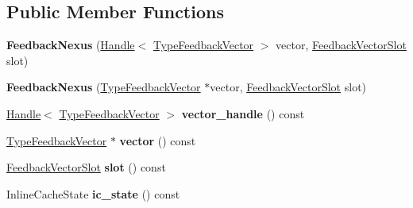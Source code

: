\subsection*{Public Member Functions}
\begin{DoxyCompactItemize}
\item 
{\bfseries Feedback\+Nexus} (\hyperlink{classv8_1_1internal_1_1_handle}{Handle}$<$ \hyperlink{classv8_1_1internal_1_1_type_feedback_vector}{Type\+Feedback\+Vector} $>$ vector, \hyperlink{classv8_1_1internal_1_1_feedback_vector_slot}{Feedback\+Vector\+Slot} slot)\hypertarget{classv8_1_1internal_1_1_feedback_nexus_a235196596e85d98454d7932fb36f234d}{}\label{classv8_1_1internal_1_1_feedback_nexus_a235196596e85d98454d7932fb36f234d}

\item 
{\bfseries Feedback\+Nexus} (\hyperlink{classv8_1_1internal_1_1_type_feedback_vector}{Type\+Feedback\+Vector} $\ast$vector, \hyperlink{classv8_1_1internal_1_1_feedback_vector_slot}{Feedback\+Vector\+Slot} slot)\hypertarget{classv8_1_1internal_1_1_feedback_nexus_a9ddae960046174fc5fb3e13eec04e27d}{}\label{classv8_1_1internal_1_1_feedback_nexus_a9ddae960046174fc5fb3e13eec04e27d}

\item 
\hyperlink{classv8_1_1internal_1_1_handle}{Handle}$<$ \hyperlink{classv8_1_1internal_1_1_type_feedback_vector}{Type\+Feedback\+Vector} $>$ {\bfseries vector\+\_\+handle} () const \hypertarget{classv8_1_1internal_1_1_feedback_nexus_a020af8fdd21b6cea3065d0f332d5bfc1}{}\label{classv8_1_1internal_1_1_feedback_nexus_a020af8fdd21b6cea3065d0f332d5bfc1}

\item 
\hyperlink{classv8_1_1internal_1_1_type_feedback_vector}{Type\+Feedback\+Vector} $\ast$ {\bfseries vector} () const \hypertarget{classv8_1_1internal_1_1_feedback_nexus_ae8a7608144b3e71e866878ed6246391d}{}\label{classv8_1_1internal_1_1_feedback_nexus_ae8a7608144b3e71e866878ed6246391d}

\item 
\hyperlink{classv8_1_1internal_1_1_feedback_vector_slot}{Feedback\+Vector\+Slot} {\bfseries slot} () const \hypertarget{classv8_1_1internal_1_1_feedback_nexus_a426327075bfa154a6456589bd2db594d}{}\label{classv8_1_1internal_1_1_feedback_nexus_a426327075bfa154a6456589bd2db594d}

\item 
Inline\+Cache\+State {\bfseries ic\+\_\+state} () const \hypertarget{classv8_1_1internal_1_1_feedback_nexus_a0f7ceeb3509dfc7ee53b5af6834f4d0c}{}\label{classv8_1_1internal_1_1_feedback_nexus_a0f7ceeb3509dfc7ee53b5af6834f4d0c}


\end{DoxyCompactItemize}
